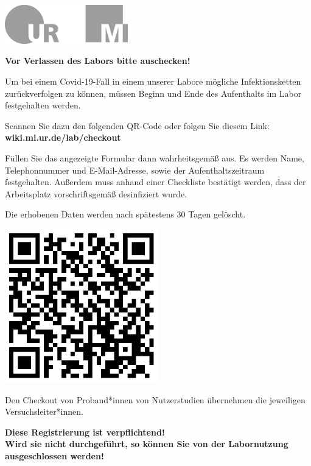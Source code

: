 \documentclass[24pt, a4paper, portrait]{article}
\begin{document}
\pagestyle{empty}

\raggedleft

\includegraphics[width=0.4\textwidth]{logo}

\vspace{1cm}
\sffamily
\centering
\huge

\textbf{Vor Verlassen des Labors bitte auschecken!}

\vspace{1cm}

\raggedright
\Large

Um bei einem Covid-19-Fall in einem unserer Labore mögliche Infektionsketten zurückverfolgen zu können, müssen Beginn und Ende des Aufenthalts im Labor festgehalten werden.

\medskip

Scannen Sie dazu den folgenden QR-Code oder folgen Sie diesem Link: \textbf{wiki.mi.ur.de/lab/checkout}

\medskip

Füllen Sie das angezeigte Formular dann wahrheitsgemäß aus.
Es werden Name, Telephonnummer und E-Mail-Adresse, sowie der Aufenthaltszeitraum festgehalten.
Außerdem muss anhand einer Checkliste bestätigt werden, dass der Arbeitsplatz vorschriftsgemäß desinfiziert wurde.

Die erhobenen Daten werden nach spätestens 30 Tagen gelöscht.

\vspace{1cm}
\centering
\includegraphics[width=0.5\textwidth]{qr/vr4_labor_checkout}

\vspace{1cm}
\raggedright
Den Checkout von Proband*innen von Nutzerstudien übernehmen die jeweiligen Versuchsleiter*innen.

\vspace{5mm}
\centering
\huge
\textbf{Diese Registrierung ist verpflichtend! \\ Wird sie nicht durchgeführt, so können Sie von der Labornutzung ausgeschlossen werden!}
\end{document}
